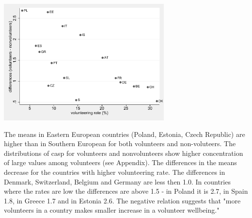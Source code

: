 \documentclass[10pt, letterpaper]{article}
\begin{document}
\begin{spacing}{1.4}
\begin{spacing}{.9} 
\begin{scriptsize} 
	 
      \label{CaspTtest} 
\end{scriptsize}
\end{spacing}


\begin{center}
\includegraphics[height=2.5in]{abs_casp.pdf}
\label{fig:casp}
\end{center}

The means in Eastern European countries (Poland, Estonia, Czech Republic) are higher than in Southern European for both volunteers and non-voluteers. The distributions of casp for volunteers and nonvolunteers show higher concentration of large values among volunteers (see Appendix). The differences in the means decrease for the countries with higher volunteering rate.  The differences in  Denmark, Switzerland, Belgium and Germany are less then 1.0. In countries where the rates are low the differences are above 1.5 - in Poland it is 2.7, in Spain 1.8, in Greece 1.7 and in Estonia 2.6. The negative relation suggests that "more volunteers in a country makes smaller increase in a volunteer wellbeing." 


\end{spacing}
\end{document}
